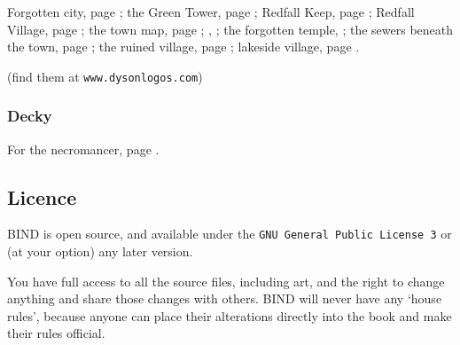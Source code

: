 \begin{multicols}{2}
Forgotten city, page \pageref{Dyson_Logos/forgotten_city};
the Green Tower, page \pageref{Dyson_Logos/green_tower};
Redfall Keep, page \pageref{Dyson_Logos/redfall_keep};
Redfall Village, page \pageref{Dyson_Logos/redfall};
the town map, page \pageref{Dyson_Logos/town};
, \pageref{Dyson_Logos/mincing_pig};
the forgotten temple, \pageref{Dyson_Logos/qualme_temple};
the sewers beneath the town, page \pageref{Dyson_Logos/sewer};
the ruined village, page \pageref{Dyson_Logos/ruined_village};
lakeside village, page \pageref{Dyson_Logos/lakeside}.

(find them at {\tt www.dysonlogos.com})

\subsubsection{Decky}

For the necromancer, page \pageref{Decky/necromancer}.

\subsection*{Licence}

BIND is open source, and available under the {\tt GNU General Public License 3} or (at your option) any later version.

You have full access to all the source files, including art, and the right to change anything and share those changes with others.
BIND will never have any `house rules', because anyone can place their alterations directly into the book and make their rules official.

\end{multicols}
